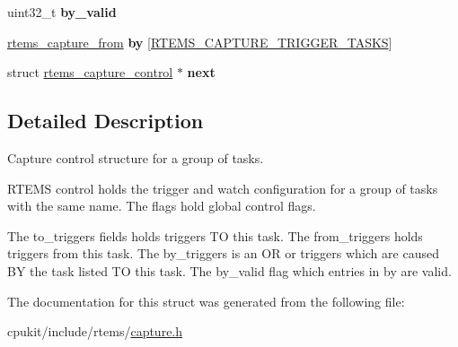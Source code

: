 \begin{DoxyCompactItemize}
uint32\+\_\+t {\bfseries by\+\_\+valid}
\item 
\mbox{\label{structrtems__capture__control_a06eb06b5b8b394692c0c06bb35937de1}} 
\mbox{\hyperlink{structrtems__capture__from}{rtems\+\_\+capture\+\_\+from}} {\bfseries by} \mbox{[}\mbox{\hyperlink{group__libmisc__capture_gabac5efd1e36645cb55fbe5fb5fff3ec5}{R\+T\+E\+M\+S\+\_\+\+C\+A\+P\+T\+U\+R\+E\+\_\+\+T\+R\+I\+G\+G\+E\+R\+\_\+\+T\+A\+S\+KS}}\mbox{]}
\item 
\mbox{\label{structrtems__capture__control_a2311c5916095657ec8e7012c07274d22}} 
struct \mbox{\hyperlink{structrtems__capture__control}{rtems\+\_\+capture\+\_\+control}} $\ast$ {\bfseries next}
\end{DoxyCompactItemize}


\subsection{Detailed Description}
Capture control structure for a group of tasks. 

R\+T\+E\+MS control holds the trigger and watch configuration for a group of tasks with the same name. The flags hold global control flags.

The to\+\_\+triggers fields holds triggers TO this task. The from\+\_\+triggers holds triggers from this task. The by\+\_\+triggers is an OR or triggers which are caused BY the task listed TO this task. The by\+\_\+valid flag which entries in by are valid. 

The documentation for this struct was generated from the following file\+:\begin{DoxyCompactItemize}
\item 
cpukit/include/rtems/\mbox{\hyperlink{capture_8h}{capture.\+h}}\end{DoxyCompactItemize}
